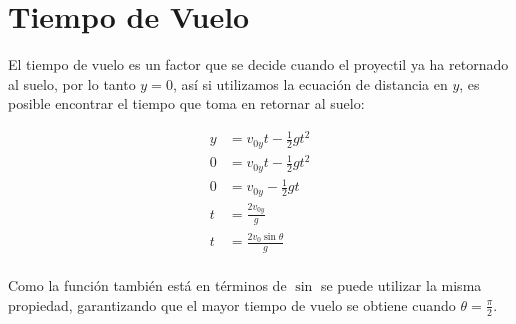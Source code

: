 \section{Tiempo de Vuelo}
\label{sec:tiempo_de_vuelo}

El tiempo de vuelo es un factor que se decide cuando el proyectil ya ha
retornado al suelo, por lo tanto \(y=0\), así si utilizamos la ecuación de
distancia en  \(y\), es posible encontrar el tiempo que toma en retornar al
suelo:

\begin{align*}
    y &=  v_{0y}t-\frac{1}{2}gt^{2} \\
    0 &=  v_{0y}t-\frac{1}{2}gt^{2} \\
    0 &=  v_{0y}-\frac{1}{2}gt \\
    t &=  \frac{2v_{0y}}{g} \\
    t &=  \frac{2v_0\sin\theta }{g} \\
\end{align*}

Como la función también está en términos de \(\sin\) se puede utilizar la misma
propiedad, garantizando que el mayor tiempo de vuelo se obtiene cuando \(\theta
= \frac{\pi }{2}\).
